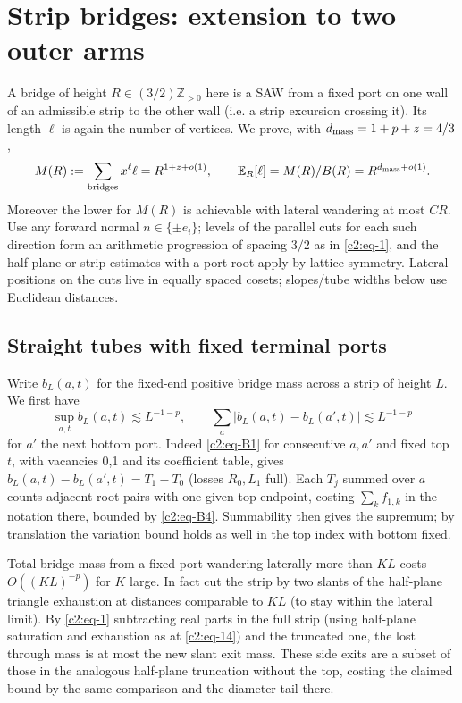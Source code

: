 \section{Strip bridges: extension to two outer arms}\label{c2:strips}

A bridge of height \(R\in (3/2)\mathbb Z_{>0}\) here is a SAW from a fixed port on one wall of an admissible strip to the other wall (i.e. a strip excursion crossing it). Its length \(\ell\) is again the number of vertices. We prove, with \(d_{\rm mass}=1+p+z=4/3\),
\begin{equation}
 M(R):=\sum_{\rm bridges}x^\ell\ell=R^{1+z+o(1)},\qquad
 \mathbb E_R[\ell]=M(R)/B(R)=R^{d_{\rm mass}+o(1)}.                       \label{c2:eq-E1}
\end{equation}
Moreover the lower for \(M(R)\) is achievable with lateral wandering at most \(C R\). Use any forward normal \(n\in\{\pm e_i\}\); levels of the parallel cuts for each such direction form an arithmetic progression of spacing \(3/2\) as in \eqref{c2:eq-1}, and the half-plane or strip estimates with a port root apply by lattice symmetry. Lateral positions on the cuts live in equally spaced cosets; slopes/tube widths below use Euclidean distances.

\subsection{Straight tubes with fixed terminal ports} Write \(b_L(a,t)\) for the fixed-end positive bridge mass across a strip of height \(L\). We first have
\begin{equation}
 \sup_{a,t} b_L(a,t)\lesssim L^{-1-p},\qquad
 \sum_a |b_L(a,t)-b_L(a',t)|\lesssim L^{-1-p}                             \label{c2:eq-E2}
\end{equation}
for \(a'\) the next bottom port. Indeed \eqref{c2:eq-B1} for consecutive \(a,a'\) and fixed top \(t\), with vacancies 0,1 and its coefficient table, gives \(b_L(a,t)-b_L(a',t)=T_1-T_0\) (losses \(R_0,L_1\) full). Each \(T_j\) summed over \(a\) counts adjacent-root pairs with one given top endpoint, costing \(\sum_k f_{1,k}\) in the notation there, bounded by \eqref{c2:eq-B4}. Summability then gives the supremum; by translation the variation bound holds as well in the top index with bottom fixed.

Total bridge mass from a fixed port wandering laterally more than \(K L\) costs \(O((KL)^{-p})\) for \(K\) large. In fact cut the strip by two slants of the half-plane triangle exhaustion at distances comparable to \(K L\) (to stay within the lateral limit). By \eqref{c2:eq-1} subtracting real parts in the full strip (using half-plane saturation and exhaustion as at \eqref{c2:eq-14}) and the truncated one, the lost through mass is at most the new slant exit mass. These side exits are a subset of those in the analogous half-plane truncation without the top, costing the claimed bound by the same comparison and the diameter tail there.

